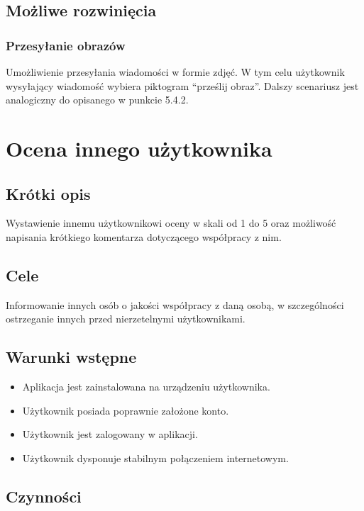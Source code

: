\documentclass[licencjacka]{pracamgr}
\begin{document}
    \subsection{Możliwe rozwinięcia}
    \subsubsection{Przesyłanie obrazów}
    Umożliwienie przesyłania wiadomości w formie zdjęć. W tym celu użytkownik wysyłający wiadomość wybiera piktogram ``prześlij obraz''. Dalszy scenariusz jest analogiczny do opisanego w punkcie 5.4.2.

\section{Ocena innego użytkownika}
    \subsection{Krótki opis}
    Wystawienie innemu użytkownikowi oceny w skali od 1 do 5 oraz możliwość napisania krótkiego komentarza dotyczącego współpracy z nim.
    \subsection{Cele}
    Informowanie innych osób o jakości współpracy z daną osobą, w szczególności ostrzeganie innych przed nierzetelnymi użytkownikami.
    \subsection{Warunki wstępne}
    \begin{itemize}
        \item Aplikacja jest zainstalowana na urządzeniu użytkownika.
        \item Użytkownik posiada poprawnie założone konto.
        \item Użytkownik jest zalogowany w aplikacji.
        \item Użytkownik dysponuje stabilnym połączeniem internetowym.
    \end{itemize}
    \subsection{Czynności}
\end{document}
